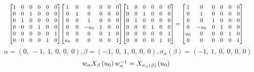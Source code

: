 \documentclass[11pt]{article}
\theoremstyle{definition}
\begin{document}
\[
\scaletoalign{\textwidth}{{\left[\begin{matrix}1 & 0 & 0 & 0 & 0 & 0\\0 & 0 & 1 & 0 & 0 & 0\\0 & 1 & 0 & 0 & 0 & 0\\0 & 0 & 0 & 1 & 0 & 0\\0 & 0 & 0 & 0 & 0 & 1\\0 & 0 & 0 & 0 & 1 & 0\end{matrix}\right]} {\left[\begin{matrix}1 & 0 & 0 & 0 & 0 & 0\\0 & 1 & 0 & 0 & 0 & 0\\0 & 0 & 1 & 0 & 0 & 0\\0 & 0 & - u_{0} & 1 & 0 & 0\\0 & 0 & 0 & 0 & 1 & 0\\u_{0} & 0 & 0 & 0 & 0 & 1\end{matrix}\right]} {\left[\begin{matrix}1 & 0 & 0 & 0 & 0 & 0\\0 & 0 & 1 & 0 & 0 & 0\\0 & 1 & 0 & 0 & 0 & 0\\0 & 0 & 0 & 1 & 0 & 0\\0 & 0 & 0 & 0 & 0 & 1\\0 & 0 & 0 & 0 & 1 & 0\end{matrix}\right]} = {\left[\begin{matrix}1 & 0 & 0 & 0 & 0 & 0\\0 & 1 & 0 & 0 & 0 & 0\\0 & 0 & 1 & 0 & 0 & 0\\0 & - u_{0} & 0 & 1 & 0 & 0\\u_{0} & 0 & 0 & 0 & 1 & 0\\0 & 0 & 0 & 0 & 0 & 1\end{matrix}\right]}}
\]
\[
\alpha = \left( 0, \  -1, \  1, \  0, \  0, \  0\right), \beta = \left( -1, \  0, \  1, \  0, \  0, \  0\right), \sigma_{\alpha}(\beta) = \left( -1, \  1, \  0, \  0, \  0, \  0\right)
\]
\[
\scaletoalign{\textwidth}{w_{\alpha} X_{\beta}\left(u_{0}\right) w_{\alpha}^{-1} = X_{\sigma_{\alpha}\left(\beta\right)}\left(u_{0}\right)}
\]
\end{document}
